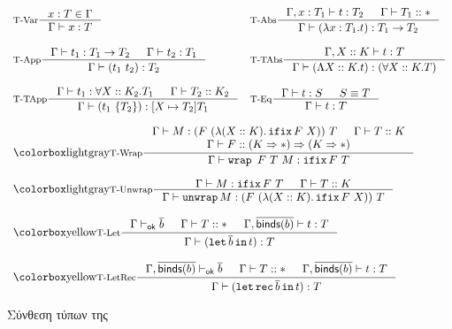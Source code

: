 \begin{figure}[!ht]
    \centering
    \begin{minipage}[t]{15cm}
    \centering
    \begin{displaymath}
    \begin{array}{ll}
    \inference[T-Var]{x:T \in \Gamma}{\Gamma \vdash x:T}  &
    \inference[T-Abs]{\Gamma, x:T_1 \vdash t:T_2 & \Gamma \vdash T_1 :: \Type}{\Gamma \vdash (\lambda x:T_1.t) : T_1 \typeArrow T_2} \\
    \\
    \inference[T-App]{\Gamma \vdash t_1 : T_1 \typeArrow T_2 & \Gamma \vdash t_2 : T_1}{\Gamma \vdash (t_1 ~ t_2) : T_2} &
    \inference[T-TAbs]{\Gamma, X::K \vdash t:T }{\Gamma \vdash (\Lambda X::K.t) : (\forall X::K.T)} \\
    \\
    \inference[T-TApp]{\Gamma \vdash t_1: \forall X::K_2.T_1  & \Gamma \vdash T_2 :: K_2} {\Gamma \vdash (t_1 ~\{T_2\}) : \subst{X}{T_2}{T_1}} &
    \inference[T-Eq]{\Gamma \vdash t : S & S \equiv T}{\Gamma \vdash t : T} \\
    \\
    \multicolumn{2}{l}{\fomfDiff{\inference[T-Wrap]{\Gamma \vdash M: (F ~( \lambda (X :: K). \ifix F ~X)) ~T & \Gamma \vdash T:: K \\ \Gamma \vdash F :: (K\kindArrow\Type)\kindArrow (K\kindArrow\Type)}
            {\Gamma \vdash \wrap ~ F ~ T ~ M : \ifix F ~T} } }\\
    \\
    \multicolumn{2}{l}{\fomfDiff{\inference[T-Unwrap]{\Gamma \vdash M : \ifix F ~T & \Gamma \vdash T :: K }
            {\Gamma \vdash \unwrap M : (F ~( \lambda (X :: K). \ifix F ~X)) ~T  } } }\\
    \\
    \multicolumn{2}{l}{\firDiff{\inference[T-Let]{
    \Gamma \provesok \seq{b} &
    \Gamma \vdash T :: \Type &
    \Gamma, \seq{\binds{b}} \vdash t : T
    }
    { \Gamma \vdash (\tlet \seq{b} \tin t) : T
    }}}\\
    \\
    \multicolumn{2}{l}{\firDiff{\inference[T-LetRec]{
    \Gamma, \seq{\binds{b}} \provesok \seq{b} &
    \Gamma \vdash T :: \Type &
    \Gamma, \seq{\binds{b}} \vdash t : T
    }
    { \Gamma \vdash (\tlet \rec \seq{b} \tin t) : T
    }}}
    \end{array}
    \end{displaymath}
    \end{minipage}
    \caption{Σύνθεση τύπων της \FIR}
    \label{fig:fir_typing}
\end{figure}
